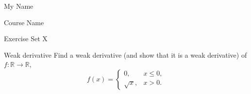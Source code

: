 \documentclass[12pt,reqno,a4paper,oneside]{article}
\newcommand{\R}{\mathbb{R}}
\theoremstyle{definition}
\begin{document}
	
	\begin{center}
		{\Large {} \calligra My Name
			
			Course Name
			
			\vspace{2mm}
			
			Exercise Set X}
	\end{center}
	
	\begin{ex}{Weak derivative}{}
		Find a weak derivative (and show that it is a weak derivative) of $f\colon \R \to \R$, $$f(x) = \begin{cases}
			0, & x\leq 0,\\
			\sqrt{x}, &x > 0.
		\end{cases}$$
	\end{ex}
\end{document}
